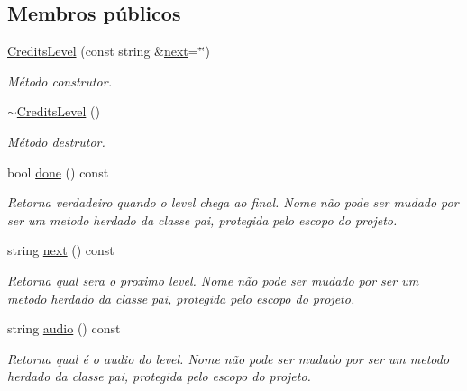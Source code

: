 \subsection*{Membros públicos}
\begin{DoxyCompactItemize}
\item 
\mbox{\hyperlink{classCreditsLevel_a2516ba82d10b2eb959d03eea3df0a32c}{Credits\+Level}} (const string \&\mbox{\hyperlink{classCreditsLevel_ad8c392e8e0175052a4451481bddaddfe}{next}}=\char`\"{}\char`\"{})
\begin{DoxyCompactList}\small\item\em Método construtor. \end{DoxyCompactList}\item 
\mbox{\label{classCreditsLevel_a0d977ddb97700fef21dfcaa79c9ccb91}} 
\mbox{\hyperlink{classCreditsLevel_a0d977ddb97700fef21dfcaa79c9ccb91}{$\sim$\+Credits\+Level}} ()
\begin{DoxyCompactList}\small\item\em Método destrutor. \end{DoxyCompactList}\item 
bool \mbox{\hyperlink{classCreditsLevel_a80b93759949ba662627b52d0a51325ce}{done}} () const
\begin{DoxyCompactList}\small\item\em Retorna verdadeiro quando o level chega ao final. Nome não pode ser mudado por ser um metodo herdado da classe pai, protegida pelo escopo do projeto. \end{DoxyCompactList}\item 
string \mbox{\hyperlink{classCreditsLevel_ad8c392e8e0175052a4451481bddaddfe}{next}} () const
\begin{DoxyCompactList}\small\item\em Retorna qual sera o proximo level. Nome não pode ser mudado por ser um metodo herdado da classe pai, protegida pelo escopo do projeto. \end{DoxyCompactList}\item 
string \mbox{\hyperlink{classCreditsLevel_a6bf8924562bb2ce7f8b85c35a9b8a52e}{audio}} () const
\begin{DoxyCompactList}\small\item\em Retorna qual é o audio do level. Nome não pode ser mudado por ser um metodo herdado da classe pai, protegida pelo escopo do projeto. \end{DoxyCompactList}\end{DoxyCompactItemize}
